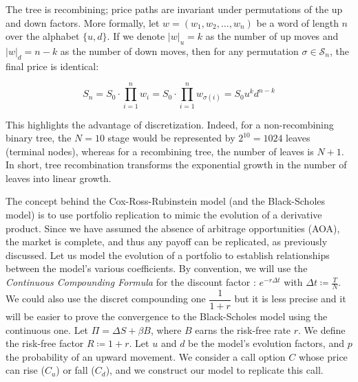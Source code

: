 \remark The tree is recombining; price paths are invariant under permutations of the up and down factors.
More formally, let $w = (w_1, w_2, \dots, w_n)$ be a word of length $n$ over the alphabet $\{u, d\}$. 
If we denote $|w|_u = k$ as the number of up moves and $|w|_d = n-k$ as the number of down moves, then for any permutation $\sigma \in \mathcal{S}_n$, the final price is identical:

$$S_n = S_0 \cdot \prod_{i=1}^{n} w_i = S_0 \cdot \prod_{i=1}^{n} w_{\sigma(i)} = S_0 u^k d^{n-k}$$

This highlights the advantage of discretization. Indeed, for a non-recombining binary tree, the $N=10$ stage would be represented by $2^{10}=1024$ leaves (terminal nodes), 
whereas for a recombining tree, the number of leaves is $N+1$. In short, tree recombination transforms the exponential growth in the number of leaves into linear growth.

The concept behind the Cox-Ross-Rubinstein model (and the Black-Scholes model) is to use portfolio replication to mimic the evolution of a derivative product. 
Since we have assumed the absence of arbitrage opportunities (AOA), the market is complete, and thus any payoff can be replicated, as previously discussed.
Let us model the evolution of a portfolio to establish relationships between the model's various coefficients.
By convention, we will use the \textit{Continuous Compounding Formula} for the discount factor : $e^{-r \Delta t}$ with $\Delta t \coloneq \frac{T}{N}$.
We could also use the discret compounding one $\dfrac{1}{1+r}$ but it is less precise and it will be easier to prove the convergence to the Black-Scholes model using the continuous one.
Let $\Pi=\Delta S+\beta B$, where $B$ earns the risk-free rate $r$. We define the risk-free factor $R \coloneqq 1+r$.
Let $u$ and $d$ be the model's evolution factors, and $p$ the probability of an upward movement.
We consider a call option $C$ whose price can rise ($C_u$) or fall ($C_d$), and we construct our model to replicate this call.


\begin{center}
\end{center}

